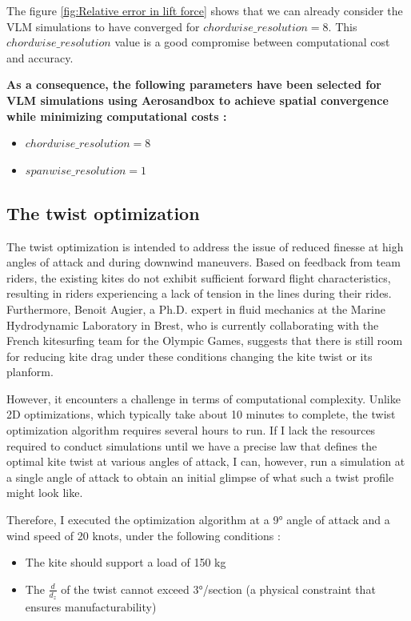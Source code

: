 The figure \ref{fig:Relative error in lift force} shows that we can already consider the VLM simulations to have converged for $chordwise\_resolution = 8$. This $chordwise\_resolution$ value is a good compromise between computational cost and accuracy.

\textbf{As a consequence, the following parameters have been selected for VLM simulations using Aerosandbox to achieve spatial convergence while minimizing computational costs : }
\begin{itemize}
    \item $chordwise\_resolution = 8$
    \item $spanwise\_resolution = 1$
\end{itemize}

\subsection{The twist optimization}
\label{sub:Ch2.3.2}

The twist optimization is intended to address the issue of reduced finesse at high angles of attack and during downwind maneuvers. Based on feedback from team riders, the existing kites do not exhibit sufficient forward flight characteristics, resulting in riders experiencing a lack of tension in the lines during their rides. Furthermore, Benoit Augier, a Ph.D. expert in fluid mechanics at the Marine Hydrodynamic Laboratory in Brest, who is currently collaborating with the French kitesurfing team for the Olympic Games, suggests that there is still room for reducing kite drag under these conditions changing the kite twist or its planform.

However, it encounters a challenge in terms of computational complexity. Unlike 2D optimizations, which typically take about 10 minutes to complete, the twist optimization algorithm requires several hours to run. If I lack the resources required to conduct simulations until we have a precise law that defines the optimal kite twist at various angles of attack, I can, however, run a simulation at a single angle of attack to obtain an initial glimpse of what such a twist profile might look like.

Therefore, I executed the optimization algorithm at a 9° angle of attack and a wind speed of 20 knots, under the following conditions :

\begin{itemize}
    \item The kite should support a load of 150 kg
    \item The $\frac{d}{d_{z}}$ of the twist cannot exceed 3°/section (a physical constraint that ensures manufacturability)
\end{itemize}

